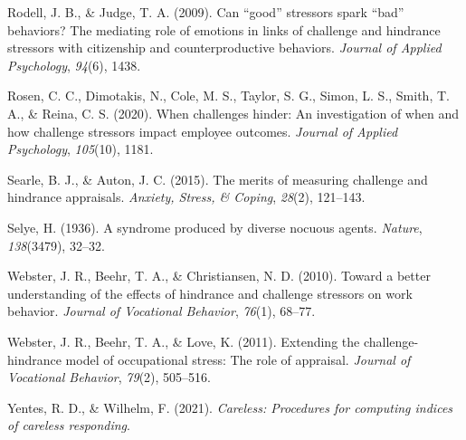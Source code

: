 \documentclass[
  man,mask]{apa6}
\newlength{\cslhangindent}
\newlength{\cslentryspacingunit} %
\newenvironment{CSLReferences}[2] %
 {%
  \setlength{\parindent}{0pt}
  \ifodd #1
  \let\oldpar\par
  \def\par{\hangindent=\cslhangindent\oldpar}
  \fi
  \setlength{\parskip}{#2\cslentryspacingunit}
 }%
 {}
\begin{document}
\begin{CSLReferences}{1}{0}
\leavevmode{}%
Rodell, J. B., \& Judge, T. A. (2009). Can {``good''} stressors spark {``bad''} behaviors? The mediating role of emotions in links of challenge and hindrance stressors with citizenship and counterproductive behaviors. \emph{Journal of Applied Psychology}, \emph{94}(6), 1438.

\leavevmode{}%
Rosen, C. C., Dimotakis, N., Cole, M. S., Taylor, S. G., Simon, L. S., Smith, T. A., \& Reina, C. S. (2020). When challenges hinder: An investigation of when and how challenge stressors impact employee outcomes. \emph{Journal of Applied Psychology}, \emph{105}(10), 1181.

\leavevmode{}%
Searle, B. J., \& Auton, J. C. (2015). The merits of measuring challenge and hindrance appraisals. \emph{Anxiety, Stress, \& Coping}, \emph{28}(2), 121--143.

\leavevmode{}%
Selye, H. (1936). A syndrome produced by diverse nocuous agents. \emph{Nature}, \emph{138}(3479), 32--32.

\leavevmode{}%
Webster, J. R., Beehr, T. A., \& Christiansen, N. D. (2010). Toward a better understanding of the effects of hindrance and challenge stressors on work behavior. \emph{Journal of Vocational Behavior}, \emph{76}(1), 68--77.

\leavevmode{}%
Webster, J. R., Beehr, T. A., \& Love, K. (2011). Extending the challenge-hindrance model of occupational stress: The role of appraisal. \emph{Journal of Vocational Behavior}, \emph{79}(2), 505--516.

\leavevmode{}%
Yentes, R. D., \& Wilhelm, F. (2021). \emph{Careless: Procedures for computing indices of careless responding}.

\end{CSLReferences}

\endgroup
\end{document}
